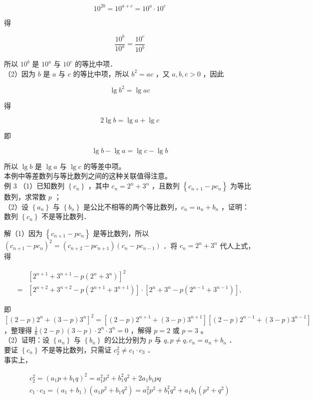 \documentclass[10pt]{article}
\begin{document}
\[
10^{2 b}=10^{a+c}=10^{a} \cdot 10^{c}
\]

得

\[
\frac{10^{b}}{10^{a}}=\frac{10^{c}}{10^{b}}
\]

所以 \(10^{b}\) 是 \(10^{a}\) 与 \(10^{c}\) 的等比中项．\\
（2）因为 \(b\) 是 \(a\) 与 \(c\) 的等比中项，所以 \(b^{2}=a c\) ，又 \(a, b, c>0\) ，因此

\[
\lg b^{2}=\lg a c
\]

得

\[
2 \lg b=\lg a+\lg c
\]

即

\[
\lg b-\lg a=\lg c-\lg b
\]

所以 \(\lg b\) 是 \(\lg a\) 与 \(\lg c\) 的等差中项。\\
本例中等差数列与等比数列之间的这种关联值得注意。\\
例 3 （1）已知数列 \(\left\{c_{n}\right\}\) ，其中 \(c_{n}=2^{n}+3^{n}\) ，且数列 \(\left\{c_{n+1}-p c_{n}\right\}\) 为等比数列，求常数 \(p\) ；\\
（2）设 \(\left\{a_{n}\right\}\) 与 \(\left\{b_{n}\right\}\) 是公比不相等的两个等比数列，\(c_{n}=a_{n}+b_{n}\) ，证明：数列 \(\left\{c_{n}\right\}\) 不是等比数列．

解（1）因为 \(\left\{c_{n+1}-p c_{n}\right\}\) 是等比数列，所以 \(\left(c_{n+1}-p c_{n}\right)^{2}=\left(c_{n+2}-p c_{n+1}\right)\left(c_{n}-p c_{n-1}\right)\) ．将 \(c_{n}=2^{n}+3^{n}\) 代人上式，得

\[
\begin{aligned}
& {\left[2^{n+1}+3^{n+1}-p\left(2^{n}+3^{n}\right)\right]^{2} } \\
= & {\left[2^{n+2}+3^{n+2}-p\left(2^{n+1}+3^{n+1}\right)\right] \cdot\left[2^{n}+3^{n}-p\left(2^{n-1}+3^{n-1}\right)\right], }
\end{aligned}
\]

即 \(\left[(2-p) 2^{n}+(3-p) 3^{n}\right]^{2}=\left[(2-p) 2^{n+1}+(3-p) 3^{n+1}\right]\left[(2-p) 2^{n-1}+(3-p) 3^{n-1}\right]\) ，整理得 \(\frac{1}{6}(2-p)(3-p) \cdot 2^{n} \cdot 3^{n}=0\) ，解得 \(p=2\) 或 \(p=3\) 。\\
（2）证明：设 \(\left\{a_{n}\right\}\) 与 \(\left\{b_{n}\right\}\) 的公比分别为 \(p\) 与 \(q, p \neq q, c_{n}=a_{n}+b_{n}\) ．\\
要证 \(\left\{c_{n}\right\}\) 不是等比数列，只需证 \(c_{2}^{2} \neq c_{1} \cdot c_{3}\) ．\\
事实上，

\[
\begin{gathered}
c_{2}^{2}=\left(a_{1} p+b_{1} q\right)^{2}=a_{1}^{2} p^{2}+b_{1}^{2} q^{2}+2 a_{1} b_{1} p q \\
c_{1} \cdot c_{3}=\left(a_{1}+b_{1}\right)\left(a_{1} p^{2}+b_{1} q^{2}\right)=a_{1}^{2} p^{2}+b_{1}^{2} q^{2}+a_{1} b_{1}\left(p^{2}+q^{2}\right)
\end{gathered}
\]
\end{document}
